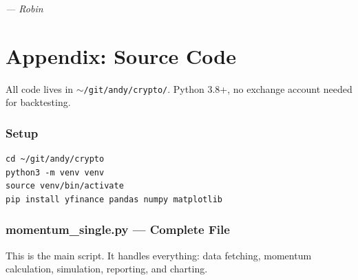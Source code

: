 \documentclass[11pt,a4paper]{article}
\begin{document}
\vspace{2em}
\begin{center}
\textit{--- Robin}
\end{center}

\newpage


\appendix
\part*{Appendix: Source Code}

All code lives in \texttt{$\sim$/git/andy/crypto/}. Python 3.8+,
no exchange account needed for backtesting.

\section{Setup}

\begin{codebox}[Shell]
\begin{lstlisting}[style=shell]
cd ~/git/andy/crypto
python3 -m venv venv
source venv/bin/activate
pip install yfinance pandas numpy matplotlib
\end{lstlisting}
\end{codebox}

\section{momentum\_single.py --- Complete File}

This is the main script. It handles everything: data fetching,
momentum calculation, simulation, reporting, and charting.
\end{document}
